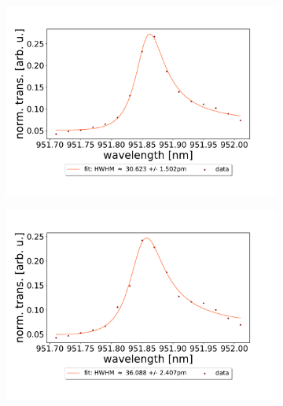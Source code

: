 \begin{figure}[h!]
    \centering
    \begin{subfigure}[b]{0.49\textwidth}
        \includegraphics[width=\textwidth]{figures/results/double fano fits/550um_M3:M5_fit_1.pdf}
        \caption{}
        \label{fig:550um_M3:M5_fit_1}
    \end{subfigure}
    \begin{subfigure}[b]{0.49\textwidth}
        \includegraphics[width=\textwidth]{figures/results/double fano fits/550um_M3:M5_fit_2.pdf}
        \caption{}
        \label{fig:550um_M3:M5_fit_2}
    \end{subfigure}
    \begin{subfigure}[b]{0.49\textwidth}

\end{subfigure}
\end{figure}
